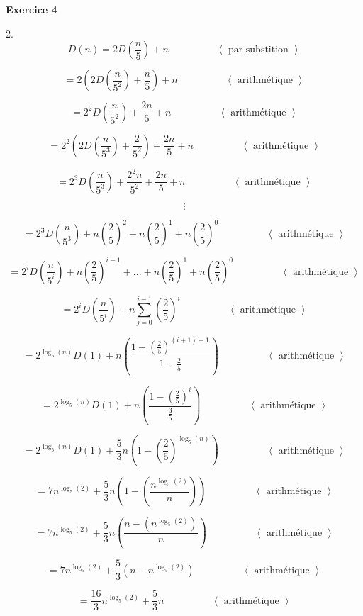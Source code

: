 \documentclass{article}
\newcommand{\tuple}[1]{\ensuremath{\left\langle #1 \right\rangle}}
\newcommand{\pare}[1]{ \left( #1 \right) }
\begin{document}
    
\textbf{Exercice 4}

\vspace{0.5cm}
2.
\[
D(n) = 2D\pare{\frac{n}{5}} + n 
\hspace{2cm} \tuple{ \text{ par substition } }
\]

\[
= 2\pare{2D\pare{\frac{n}{5^2}} + \frac{n}{5}} + n 
\hspace{2cm} \tuple{ \text{ arithmétique  }}
\]

\[
= 2^2D\pare{\frac{n}{5^2}} + \frac{2n}{5} + n 
\hspace{2cm} \tuple{ \text{ arithmétique  }}
\]

\[
= 2^2\pare{2D\pare{\frac{n}{5^3}} + \frac{2}{5^2}} + \frac{2n}{5} + n 
\hspace{2cm} \tuple{ \text{ arithmétique  }}
\]

\[
= 2^3D\pare{\frac{n}{5^3}} + \frac{2^2n}{5^2} + \frac{2n}{5} + n 
\hspace{2cm} \tuple{ \text{ arithmétique  }}
\]

\[
\vdots
\]


\[
= 2^3D\pare{\frac{n}{5^3}} + n\pare{\frac{2}{5}}^2 + n\pare{\frac{2}{5}}^1 + n\pare{\frac{2}{5}}^0
\hspace{2cm} \tuple{ \text{ arithmétique  }}
\]

\[
= 2^iD\pare{\frac{n}{5^i}} + n\pare{\frac{2}{5}}^{i - 1} + ... + n\pare{\frac{2}{5}}^1 + n\pare{\frac{2}{5}}^0
\hspace{2cm} \tuple{ \text{ arithmétique  }}
\]

\[
= 2^iD\pare{\frac{n}{5^i}} + n\sum_{j=0}^{i-1} \left(\frac{2}{5}\right)^i
\hspace{2cm} \tuple{ \text{ arithmétique  }}
\]

\[
= 2^{\log_{5}(n)}D\pare{1} + n \pare{\frac{1 - \pare{\frac{2}{5}}^{(i+1) - 1}}{1 - \frac{2}{5}}}
\hspace{2cm} \tuple{ \text{ arithmétique  }}
\]

\[
= 2^{\log_{5}(n)}D\pare{1} + n \pare{\frac{1 - \pare{\frac{2}{5}}^{i}}{\frac{3}{5}}}
\hspace{2cm} \tuple{ \text{ arithmétique  }}
\]

\[
= 2^{\log_{5}(n)}D\pare{1} + {\frac{5}{3}} n \pare{1 - \pare{\frac{2}{5}}^{\log_{5}(n)}}
\hspace{2cm} \tuple{ \text{ arithmétique  }}
\]

\[
= 7n^{\log_{5}(2)} +
{\frac{5}{3}} n \pare{1 - \pare{\frac{n^{\log_{5}(2)}}{n}}}
\hspace{2cm} \tuple{ \text{ arithmétique  }}
\]

\[
= 7n^{\log_{5}(2)} +
{\frac{5}{3}} n \pare{ \frac{n - \pare{ n^{ \log_{5}(2) } }}{n} }
\hspace{2cm} \tuple{ \text{ arithmétique  }}
\]

\[
= 7n^{\log_{5}(2)} +
{\frac{5}{3}} \pare{ n - n^{ \log_{5}(2) } } 
\hspace{2cm} \tuple{ \text{ arithmétique  }}
\]

\[
= \frac{16}{3}n^{\log_{5}(2)} + {\frac{5}{3}}n
\hspace{2cm} \tuple{ \text{ arithmétique  }}
\]
\end{document}
